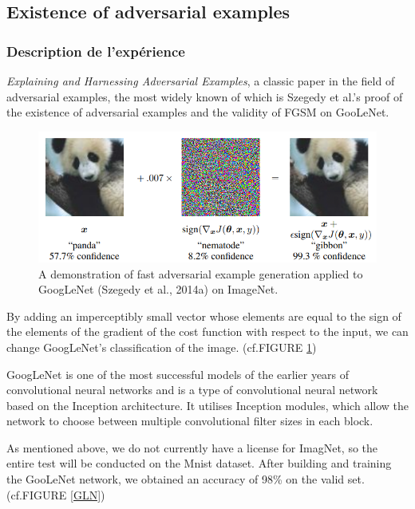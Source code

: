 \subsection{Existence of adversarial examples}
\subsubsection{Description de l'expérience}
\textit{Explaining and Harnessing Adversarial Examples}\citep{goodfellow2014explaining}, a classic paper in the field of adversarial examples, the most widely known of which is Szegedy et al.'s proof of the existence of adversarial examples and the validity of FGSM on GooLeNet.

\FloatBarrier
\begin{figure}[htbp]%
        \centering
        \includegraphics[scale=0.4]{imagePanda.png}%
        \caption{ A demonstration of fast adversarial example generation applied to GoogLeNet (Szegedy et al., 2014a) on ImageNet.}
        \label{panda}
\end{figure}\par
\FloatBarrier

By adding an imperceptibly small vector whose elements are equal to the sign of the elements of the gradient of the cost function with respect to the input, we can change GoogLeNet’s classification of the image. (cf.FIGURE \ref{panda}) 

GoogLeNet is one of the most successful models of the earlier years of convolutional neural networks and is a type of convolutional neural network based on the Inception architecture. It utilises Inception modules, which allow the network to choose between multiple convolutional filter sizes in each block. 

As mentioned above, we do not currently have a license for ImagNet, so the entire test will be conducted on the Mnist dataset. After building and training the GooLeNet network, we obtained an accuracy of 98\% on the valid set. (cf.FIGURE \ref{GLN})

